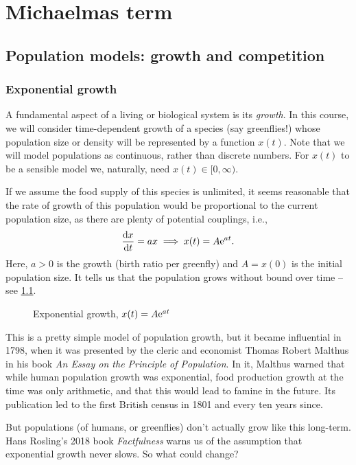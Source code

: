 \documentclass[main.tex]{subfiles}
\begin{document}
\part{Michaelmas term}

\chapter{Population models: growth and competition}
\label{chap:growth}
\section{Exponential growth}
A fundamental aspect of a living or biological system is its \emph{growth}. In this course, we will consider time-dependent growth of a species (say greenflies!) whose population size or density will be represented by a function $x(t)$. Note that we will model populations as continuous, rather than discrete numbers. For $x(t)$ to be a sensible model we, naturally, need $x(t)\in[0,\infty)$.

If we assume the food supply of this species is unlimited, it seems reasonable that the rate of growth of this population would be proportional to the current population size, as there are plenty of potential couplings, i.e.,
\begin{equation}\label{exp_growth_model}
\fd{x}{t} = a x \implies x(t) = A\e^{a t}.
\end{equation}
Here, $a>0$ is the growth (birth ratio per greenfly) and $A = x(0)$ is the initial population size. It tells us that the population grows without bound over time -- see \cref{fig:exponential-growth}.

\begin{figure}%
	\centering%
	
	\caption{Exponential growth, $x(t) = A\mathrm{e}^{a t}$}
	\label{fig:exponential-growth}
\end{figure}

This is a pretty simple model of population growth, but it became influential in 1798, when it was presented by the cleric and economist Thomas Robert Malthus in his book \emph{An Essay on the Principle of Population}. In it, Malthus warned that while human population growth was exponential, food production growth at the time was only arithmetic, and that this would lead to famine in the future. Its publication led to the first British census in 1801 and every ten years since.

But populations (of humans, or greenflies) don't actually grow like this long-term. Hans Rosling's 2018 book \emph{Factfulness} warns us of the assumption that exponential growth never slows. So what could change? 
\end{document}
